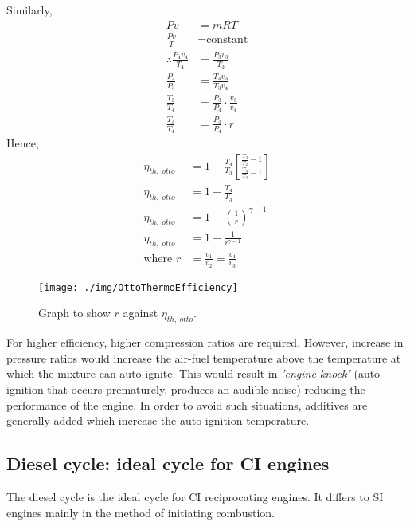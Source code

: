 Similarly,
\begin{align}
  Pv                             & = mRT                                   \\
  \frac{Pv}{T}                   & = \textrm{constant}                     \\
  \therefore \frac{P_4 v_4}{T_4} & = \frac{P_3 v_3}{T_3}                   \\
  \frac{P_4}{P_3}                & = \frac{T_4 v_3}{T_3 v_4}               \\
  \frac{T_3}{T_4}                & = \frac{P_3}{P_4} \cdot \frac{v_3}{v_4} \\
  \frac{T_3}{T_4}                & = \frac{P_3}{P_4} \cdot r
\end{align}
Hence,
\begin{align}
  \eta_{th, \ otto} & = 1 - \frac{T_4}{T_3}\left[ \frac{\frac{T_3}{T_2}- 1}{\frac{T_3}{T_2} -1} \right] \\
  \eta_{th, \ otto} & = 1 - \frac{T_4}{T_3}                                                             \\
  \eta_{th, \ otto} & = 1 - \left( \frac{1}{r} \right)^{\gamma -1}                                      \\
  \eta_{th, \ otto} & = 1 - \frac{1}{r^{\gamma -1}}                                                     \\
  \textrm{where } r & = \frac{v_1}{v_2} = \frac{v_4}{v_3}
\end{align}
\begin{figure}
  \centering
  \texttt{[image: ./img/OttoThermoEfficiency]}
  \caption{Graph to show $r$ against $\eta_{th , \ otto}$.}
\end{figure}
For higher efficiency, higher compression ratios are required. However, increase in pressure ratios would increase the air-fuel temperature above the temperature at which the mixture can auto-ignite. This would result in \emph{'engine knock'} (auto ignition that occurs prematurely, produces an audible noise) reducing the performance of the engine. In order to avoid such situations, additives are generally added which increase the auto-ignition temperature.
\subsection{Diesel cycle: ideal cycle for CI engines}
The diesel cycle is the ideal cycle for CI reciprocating engines. It differs to SI engines mainly in the method of initiating combustion.

